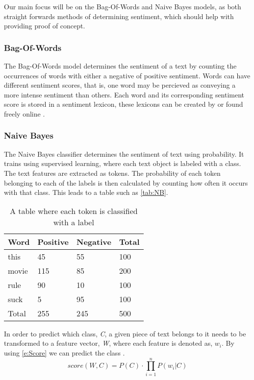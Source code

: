 
Our main focus will be on the Bag-Of-Words and Naive Bayes models, as both
straight forwards methods of determining sentiment, which should help with
providing proof of concept.

\subsubsection{Bag-Of-Words}
The Bag-Of-Words model determines the sentiment of a text by
counting the occurrences of words with either a negative of positive sentiment.
Words can have different sentiment scores, that is, one word may be percieved
as conveying a more intense sentiment than others. Each word and its
corresponding sentiment score is stored in a sentiment lexicon, these lexicons
can be created by or found freely online \citep{BagOfWords}.

\subsubsection{Naive Bayes} 
The Naive Bayes classifier determines the sentiment of text
using probability. It trains using supervised learning, where each text object
is labeled with a class. The text features are extracted as tokens.
The probability of each token belonging to each of the labels is then
calculated by counting how often it occurs with that class. This leads to a
table such as \autoref{tab:NB}.

\begin{table}[H]
\centering
\begin{tabular}{|l|l|l|l|}
\hline
Word & Positive & Negative & Total 	\\ \hline
this & 45 & 55 & 100				\\ \hline
movie & 115 & 85 & 200				\\ \hline
rule & 90 & 10 & 100				\\ \hline
suck & 5 & 95 & 100					\\ \hline
Total & 255 & 245 & 500				\\ \hline
\end{tabular}
\caption{A table where each token is classified with a label}
\label{tab:NB}
\end{table}

In order to predict which class, \textit{C}, a given piece of text belongs to it
needs to be transformed to a feature vector, \textit{W}, where each feature is
denoted as, $w_{i}$. By using \autoref{e:Score} we can predict the class \citep[Ch.2.1]{Bayes}.
\begin{equation}\label{e:Score}
score(W,C) = P(C) \cdot \displaystyle\prod_{i=1}^{n}P(w_{i}|C)
\end{equation}

